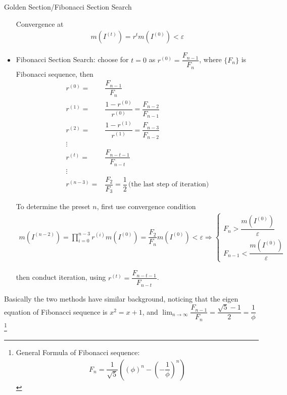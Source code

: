 \begin{algorithm}{Golden Section/Fibonacci Section Search}
\begin{itemize}[topsep=2pt,itemsep=0pt]
    Convergence at  
    \begin{align}
         m(I^{(t)})=r^{t}m(I^{(0)})<\varepsilon
    \end{align}
    
    
    
    \item Fibonacci Section Search: choose for $ t=0 $ as $ r^{(0)}=\dfrac{F_{n-1}}{F_{n}} $, where $ \{F_n\} $ is Fibonacci sequence, then
\begin{align}
    r^{(0)}=&\dfrac{F_{n-1}}{F_n}\\
    r^{(1)}=&\dfrac{1-r^{(0)}}{r^{(0)}}=\dfrac{F_{n-2}}{F_{n-1}}\\
    r^{(2)}=&\dfrac{1-r^{(1)}}{r^{(1)}}=\dfrac{F_{n-3}}{F_{n-2}}\\
    \vdots&\\
    r^{(t)}=&\dfrac{F_{n-t-1}}{F_{n-t}}\\
    \vdots&\\
    r^{(n-3)}=&\dfrac{F_2}{F_3}=\dfrac{1}{2}\,\text{(the last step of iteration)}
\end{align}
    
    To determine the preset $ n $, first use convergence condition 
    \begin{align}
         m(I^{(n-2)})=\prod_{i=0}^{n-3}r^{(i)}m(I^{(0)})=\dfrac{F_2}{F_n}m(I^{(0)})<\varepsilon \Rightarrow \begin{cases}
             F_n>\dfrac{m(I^{(0)})}{\varepsilon }\\
             F_{n-1}<\dfrac{m(I^{(0)})}{\varepsilon }
         \end{cases}
    \end{align}
    
    then conduct iteration, using $ r^{(t)}=\dfrac{F_{n-t-1}}{F_{n-t}} $.
    
\end{itemize}

    
\end{algorithm}
    


    Basically the two methods have similar background, noticing that the eigen equation of Fibonacci sequence is $ x^2=x+1 $, and $ \lim_{n\to \infty}\dfrac{F_{n-1}}{F_n}=\dfrac{\sqrt{5}-1}{2}=\dfrac{1}{\phi } $\footnote{General Formula of Fibonacci sequence:
    \begin{align}
        F_n=\dfrac{1}{\sqrt{5}}\left( (\phi )^n-(-\dfrac{1}{\phi })^n \right) 
    \end{align}
    }

